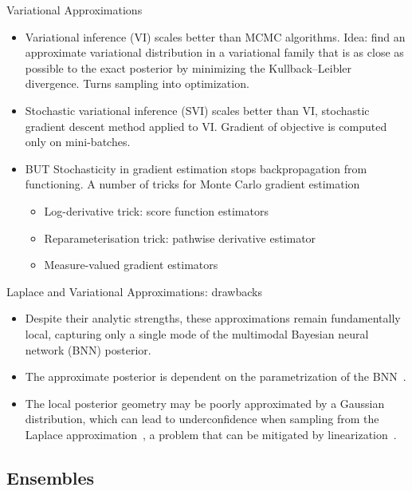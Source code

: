 \documentclass[9pt]{beamer}
\begin{document}
\begin{frame}{Variational Approximations}
\begin{itemize}[<+->]
	\item \alert{Variational inference} (VI) scales better than MCMC algorithms. Idea: find an approximate variational distribution in a variational family that is as close as possible to the exact posterior by minimizing the Kullback--Leibler divergence. Turns sampling into optimization.
	\item \alert{Stochastic variational inference} (SVI) scales better than VI, stochastic gradient descent method applied to VI. Gradient of objective is computed only on mini-batches.
	\item \alert{BUT} 	Stochasticity in gradient estimation stops backpropagation from functioning. A number of \alert{tricks} for Monte Carlo gradient estimation \citep[see][]{mohamed2020montecarlo}
	\begin{itemize}[<+->]
		\item Log-derivative trick: score function estimators
		\item Reparameterisation trick: pathwise derivative estimator
		\item Measure-valued gradient estimators
	\end{itemize}

\end{itemize}
\end{frame}



\begin{frame}{Laplace and Variational Approximations: drawbacks}
\begin{itemize}[<+->]
	\item Despite their analytic strengths, these approximations remain \alert{fundamentally local}, capturing only a single mode of the multimodal Bayesian neural network (BNN) posterior. 
	\item The approximate posterior is dependent on the parametrization of the BNN~\citep{mackay1998choice}.
	\item The \alert{local posterior geometry} may be \alert{poorly approximated by a Gaussian distribution}, which can lead to \alert{underconfidence} when sampling from the Laplace approximation~\citep{lawrence2001variational}, a problem that can be mitigated by linearization~\citep{pmlr-v130-immer21a}.
\end{itemize}
\end{frame}


\subsection{Ensembles}
\end{document}
